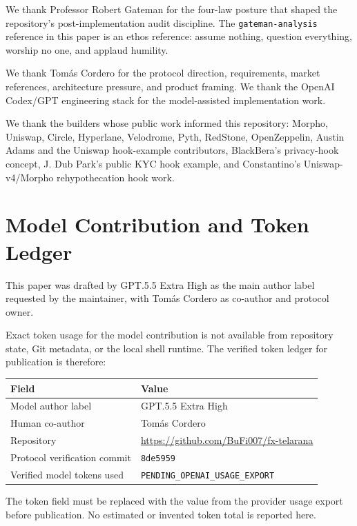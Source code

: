 \documentclass[11pt]{article}
\newcommand{\commithead}{\texttt{8de5959}}
\newcommand{\tokenledger}{\texttt{PENDING\_OPENAI\_USAGE\_EXPORT}}
\begin{document}
We thank Professor Robert Gateman for the four-law posture that shaped the
repository's post-implementation audit discipline. The
\texttt{gateman-analysis} reference in this paper is an ethos reference: assume
nothing, question everything, worship no one, and applaud humility.

We thank Tom\'as Cordero for the protocol direction, requirements, market
references, architecture pressure, and product framing. We thank the
OpenAI Codex/GPT engineering stack for the model-assisted implementation work.

We thank the builders whose public work informed this repository: Morpho,
Uniswap, Circle, Hyperlane, Velodrome, Pyth, RedStone, OpenZeppelin, Austin
Adams and the Uniswap hook-example contributors, BlackBera's privacy-hook
concept, J. Dub Park's public KYC hook example, and Constantino's
Uniswap-v4/Morpho rehypothecation hook work.

\appendix

\section{Model Contribution and Token Ledger}
\label{appendix:token-ledger}

This paper was drafted by GPT.5.5 Extra High as the main author label requested
by the maintainer, with Tom\'as Cordero as co-author and protocol owner.

Exact token usage for the model contribution is not available from repository
state, Git metadata, or the local shell runtime. The verified token ledger for
publication is therefore:

\begin{center}
\begin{tabular}{ll}
\toprule
Field & Value \\
\midrule
Model author label & GPT.5.5 Extra High \\
Human co-author & Tom\'as Cordero \\
Repository & \url{https://github.com/BuFi007/fx-telarana} \\
Protocol verification commit & \commithead{} \\
Verified model tokens used & \tokenledger{} \\
\bottomrule
\end{tabular}
\end{center}

The token field must be replaced with the value from the provider usage export
before publication. No estimated or invented token total is reported here.
\end{document}

